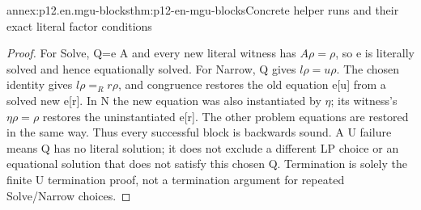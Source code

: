 \begin{annexitem}{annex:p12.en.mgu-blocks}{thm:p12-en-mgu-blocks}{Concrete helper runs and their exact literal factor conditions}
\begin{proof}
For Solve, Q=e A and every new literal witness has
\(A\rho=\rho\), so e is literally solved and hence equationally
solved. For Narrow, Q gives \(l\rho=u\rho\). The chosen
identity gives \(l\rho=_Rr\rho\), and congruence restores
the old equation e[u] from a solved new e[r]. In N the new
equation was also instantiated by \(\eta\); its witness's
\(\eta\rho=\rho\) restores the uninstantiated e[r]. The
other problem equations are restored in the same way. Thus every
successful block is backwards sound. A U failure means Q has no
literal solution; it does not exclude a different LP choice or
an equational solution that does not satisfy this chosen Q.
Termination is solely the finite U termination proof, not a
termination argument for repeated Solve/Narrow choices.
\end{proof}
\end{annexitem}

